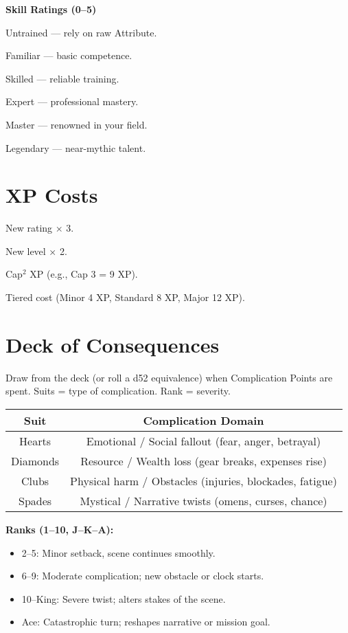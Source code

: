 \documentclass[12pt]{article}
\begin{document}
\textbf{Skill Ratings (0–5)}  
\begin{description}[leftmargin=2cm]
  \item[0] Untrained — rely on raw Attribute.  
  \item[1] Familiar — basic competence.  
  \item[2] Skilled — reliable training.  
  \item[3] Expert — professional mastery.  
  \item[4] Master — renowned in your field.  
  \item[5] Legendary — near-mythic talent.  
\end{description}

\section*{XP Costs}
\begin{description}[leftmargin=2cm]
  \item[Attributes] New rating × 3.  
  \item[Skills] New level × 2.  
  \item[Followers (On-Screen)] Cap$^2$ XP (e.g., Cap 3 = 9 XP).  
  \item[Off-Screen Assets] Tiered cost (Minor 4 XP, Standard 8 XP, Major 12 XP).  
\end{description}

\section*{Deck of Consequences}
Draw from the deck (or roll a d52 equivalence) when Complication Points are spent.  
Suits = type of complication. Rank = severity.

\begin{tabular}{|c|c|}
\hline
\textbf{Suit} & \textbf{Complication Domain} \\
\hline
Hearts & Emotional / Social fallout (fear, anger, betrayal) \\
\hline
Diamonds & Resource / Wealth loss (gear breaks, expenses rise) \\
\hline
Clubs & Physical harm / Obstacles (injuries, blockades, fatigue) \\
\hline
Spades & Mystical / Narrative twists (omens, curses, chance) \\
\hline
\end{tabular}

\medskip
\noindent
\textbf{Ranks (1–10, J–K–A):}  
\begin{itemize}
  \item 2–5: Minor setback, scene continues smoothly.  
  \item 6–9: Moderate complication; new obstacle or clock starts.  
  \item 10–King: Severe twist; alters stakes of the scene.  
  \item Ace: Catastrophic turn; reshapes narrative or mission goal.  
\end{itemize}
\end{document}
